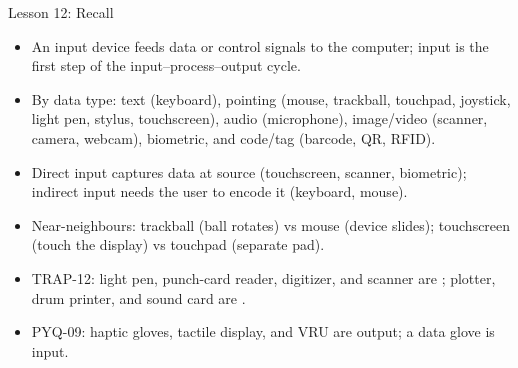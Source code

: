 \documentclass[aspectratio=169]{beamer}
\begin{document}
\begin{frame}{Lesson 12: Recall}
  \begin{itemize}
    \item An input device feeds data or control signals to the computer;
      input is the first step of the input--process--output cycle.
    \item By data type: text (keyboard), pointing (mouse, trackball,
      touchpad, joystick, light pen, stylus, touchscreen), audio
      (microphone), image/video (scanner, camera, webcam), biometric, and
      code/tag (barcode, QR, RFID).
    \item Direct input captures data at source (touchscreen, scanner,
      biometric); indirect input needs the user to encode it (keyboard,
      mouse).
    \item Near-neighbours: trackball (ball rotates) vs mouse (device
      slides); touchscreen (touch the display) vs touchpad (separate pad).
    \item TRAP-12: light pen, punch-card reader, digitizer, and scanner are
      ; plotter, drum printer, and sound card are .
    \item PYQ-09: haptic gloves, tactile display, and VRU are output; a
      data glove is input.
  \end{itemize}
\end{frame}
\end{document}
